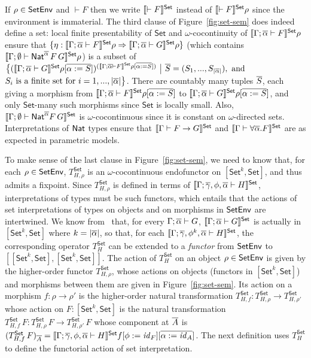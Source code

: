 \documentclass[runningheads]{llncs}
\newcommand{\set}{\mathsf{Set}}
\renewcommand{\id}{\mathit{id}}
\renewcommand{\id}{\mathit{id}}
\begin{document}
If $\rho \in \mathsf{SetEnv}$ and $\vdash F$ then we write $\setsem{\vdash F}$
instead of $\setsem{\vdash F}\rho$ since the environment is
immaterial. The third clause of Figure~\ref{fig:set-sem} does indeed
define a set: local finite presentability of $\set$ and
$\omega$-cocontinuity of $\setsem{\Gamma;\ol{\alpha} \vdash F}\rho$
ensure that $\{\eta : \setsem{\Gamma;\ol{\alpha} \vdash F}\rho
\Rightarrow \setsem{\Gamma;\ol{\alpha} \vdash G}\rho\}$ (which
contains $\setsem{\Gamma;\emptyset \vdash
  \Nat^{\ol{\alpha}}\,F\,G}\rho$) is a subset of
$\big\{({\setsem{\Gamma;\ol{\alpha} \vdash G}\rho[\ol{\alpha :=
      S}]})^{(\setsem{\Gamma;\ol{\alpha} \vdash F}\rho[\ol{\alpha :=
      S}])}~\big|~ \ol{S} = (S_1,...,S_{|\ol{\alpha}|}), \mbox{ and }$
$S_i \mbox{ is a finite set for } i =
1,...,|\overline{\alpha}|\big\}$. There are countably many tuples $\overline{S}$,
each giving a morphism from ${\setsem{\Gamma;\ol{\alpha} \vdash
    F}\rho[ \ol{\alpha := S}]}$ to ${\setsem{\Gamma;\ol{\alpha} \vdash
    G}\rho[\ol{\alpha := S}]}$, and only $\set$-many such morphisms
since $\set$ is locally small.  Also, $\setsem{\Gamma; \emptyset
  \vdash \Nat^{\ol\alpha} F\,G}$ is $\omega$-cocontinuous since it is
constant on $\omega$-directed sets. Interpretations of $\mathsf{Nat}$ types
ensure that $\setsem{\Gamma \vdash F \to G}$ and $\setsem{\Gamma
  \vdash \forall \ol\alpha. F}$ are as expected in parametric models.

To make sense of the last clause in Figure~\ref{fig:set-sem}, we need
to know that, for each $\rho \in \mathsf{SetEnv}$, $T^\set_{H,\rho}$ is an
$\omega$-cocontinuous endofunctor on $[\set^k, \set]$, and thus admits
a fixpoint.  Since $T_{H,\rho}^\set$ is defined in terms of
$\setsem{\Gamma;\ol\gamma,\phi, \ol{\alpha} \vdash H}$,
interpretations of types must be such functors, which entails that the
actions of set interpretations of types on objects and on morphisms in
$\mathsf{SetEnv}$ are intertwined.  We know from~\cite{jp19} that, for every
$\Gamma; \overline{\alpha} \vdash G$, $\setsem{\Gamma; \ol{\alpha} \vdash
  G}$ is actually in $[\set^k,\set]$ where $k = |\overline{\alpha}|$, so
that, for each $\setsem{\Gamma; \ol\gamma, \phi^k, \ol{\alpha} \vdash
  H}$, the corresponding operator $T^\set_{H}$ can be extended to a
{\em functor} from $\mathsf{SetEnv}$ to $[[\set^k,\set],[\set^k,\set]]$. The
action of $T^\set_H$ on an object $\rho \in \mathsf{SetEnv}$ is given by the
higher-order functor $T_{H,\rho}^\set$, whose actions on objects
(functors in $[\set^k, \set]$) and morphisms between them are given in
Figure~\ref{fig:set-sem}. Its action on a morphism $f : \rho \to
\rho'$ is the higher-order natural transformation $T^\set_{H,f} :
T^\set_{H,\rho} \to T^\set_{H,\rho'}$ whose action on $F :
[\set^k,\set]$ is the natural transformation $T^\set_{H,f}\, F :
T^\set_{H,\rho}\,F \to T^\set_{H,\rho'}\,F$ whose component at
$\overline{A}$ is $(T^\set_{H,f}\, F)_{\ol{A}} = \setsem{\Gamma;
  \ol\gamma,\phi,\ol{\alpha} \vdash H}f[\phi := \id_F][\ol{\alpha :=
    \id_A}]$. The next definition uses $T^\set_H$ to define the
functorial action of set interpretation.
\end{document}
